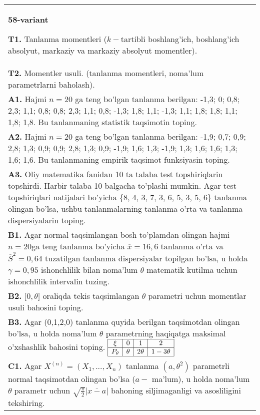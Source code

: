 \documentclass{article}
\begin{document}
\begin{tabular}{m{17cm}}
\textbf{58-variant}
\newline

\textbf{T1.} 
Tanlanma momentleri (\(k -\)tartibli boshlang'ich, boshlang'ich absolyut, markaziy va markaziy absolyut momentler).
\\
\textbf{T2.} 
Momentler usuli. (tanlanma momentleri, noma'lum parametrlarni baholash).
\\
\textbf{A1.} 
Hajmi \(n = 20\) ga teng bo'lgan tanlanma berilgan: -1,3; 0; 0,8; 2,3; 1,1; 0,8; 0,8; 2,3; 1,1; 0,8; -1,3; 1,8; 1,1; -1,3; 1,1; 1,8; 1,8; 1,1; 1,8; 1,8. Bu tanlanmaning statistik taqsimotin toping.
\\
\textbf{A2.} 
Hajmi \(n = 20\) ga teng bo'lgan tanlanma berilgan: -1,9; 0,7; 0,9; 2,8; 1,3; 0,9; 0,9; 2,8; 1,3; 0,9; -1,9; 1,6; 1,3; -1,9; 1,3; 1,6; 1,6; 1,3; 1,6; 1,6. Bu tanlanmaning empirik taqsimot funksiyasin toping.
\\
\textbf{A3.} 
Oliy matematika fanidan 10 ta talaba test topshiriqlarin topshirdi. Harbir talaba 10 balgacha to'plashi mumkin. Agar test topshiriqlari natijalari bo'yicha \{8, 4, 3, 7, 3, 6, 5, 3, 5, 6\} tanlanma olingan bo'lsa, ushbu tanlanmalarning tanlanma o'rta va tanlanma dispersiyalarin toping.
\\
\textbf{B1.} 
Agar normal taqsimlangan bosh to'plamdan olingan hajmi \(n = 20\)ga teng tanlanma bo'yicha \(\overline{x} = 16,6\) tanlanma o'rta va \({\overline{S}}^{2} = 0,64\) tuzatilgan tanlanma dispersiyalar topilgan bo'lsa, u holda \(\gamma = 0,95\) ishonchlilik bilan noma'lum \(\theta\) matematik kutilma uchun ishonchlilik intervalin tuzing.
\\
\textbf{B2.} 
\(\lbrack 0,\theta\rbrack\) oraliqda tekis taqsimlangan \(\theta\) parametri uchun momentlar usuli bahosini toping.
\\
\textbf{B3.} 
Agar (0,1,2,0) tanlanma quyida berilgan taqsimotdan olingan bo'lsa, u holda noma'lum \(\theta\) parametrning haqiqatga maksimal o'xshashlik bahosini toping.
$\begin{array}{|c|c|c|c|}
    \hline
    \xi & 0 & 1 & 2 \\
    \hline
    P_{\theta} & \theta & 2\theta & 1 - 3\theta \\
    \hline
\end{array}$
\\
\textbf{C1.} 
Agar \(X^{(n)} = \left( X_{1},...,X_{n} \right)\) tanlanma \(\left( a,\theta^{2} \right)\) parametrli normal taqsimotdan olingan bo'lsa (\(a -\) ma'lum), u holda noma'lum \(\theta\) parametr uchun \(\sqrt{\frac{\pi}{2}}\left| \overline{x - a} \right|\) bahoning siljimaganligi va asosliligini tekshiring.

\end{tabular}
\end{document}
